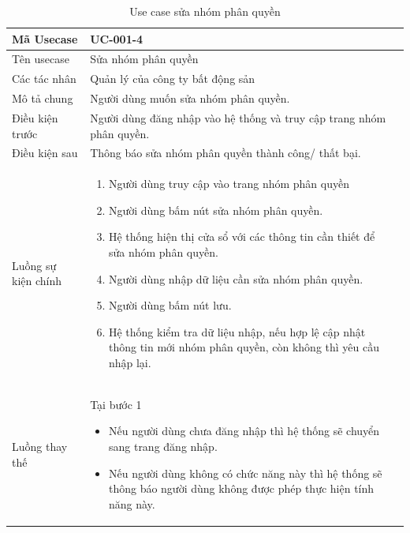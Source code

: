 \documentclass[12pt,a4paper]{article}
\begin{document}
    \begin{table}[H]
        \centering
        \begin{tabular}{|p{3.5cm}|p{11.5cm}|c|}
            \hline
            Mã Usecase      & UC-001-4                                                             \\
            \hline
            Tên usecase     & Sửa nhóm phân quyền                                                  \\
            \hline
            Các tác nhân    & Quản lý của công ty bất động sản                                     \\
            \hline
            Mô tả chung     & Người dùng muốn sửa nhóm phân quyền.                                 \\
            \hline
            Điều kiện trước & Người dùng đăng nhập vào hệ thống và truy cập trang nhóm phân quyền. \\
            \hline
            Điều kiện sau   & Thông báo sửa nhóm phân quyền thành công/ thất bại.                  \\
            \hline
            Luồng sự kiện chính & \vspace{-.8cm}\begin{enumerate}
                                                    \item Người dùng truy cập vào trang nhóm phân quyền
                                                    \item  Người dùng bấm nút sửa nhóm phân quyền.
                                                    \item  Hệ thống hiện thị cửa sổ với các thông tin cần thiết để sửa nhóm phân quyền.
                                                    \item  Người dùng nhập dữ liệu cần sửa nhóm phân quyền.
                                                    \item Người dùng bấm nút lưu.
                                                    \item Hệ thống kiểm tra dữ liệu nhập, nếu hợp lệ cập nhật thông tin mới nhóm phân quyền, còn không thì yêu cầu nhập lại.
            \end{enumerate}
            \\
            \hline
            Luồng thay thế & Tại bước 1\newline
            \vspace{-.8cm}\begin{itemize}
                              \item Nếu người dùng chưa đăng nhập thì hệ thống sẽ chuyển sang trang đăng nhập.
                              \item  Nếu người dùng không có chức năng này thì hệ thống sẽ thông báo người dùng không được phép thực hiện tính năng này.
            \end{itemize}
            \\
            \hline
        \end{tabular}
        \caption{Use case sửa nhóm phân quyền }
    \end{table}
\end{document}
